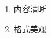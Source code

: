 \AddEnumerateCounter{\chinese}{\chinese}{}
\begin{enumerate}[label={\chinese*、},labelsep=0pt]
  \item 内容清晰
  \item 格式美观
\end{enumerate}
